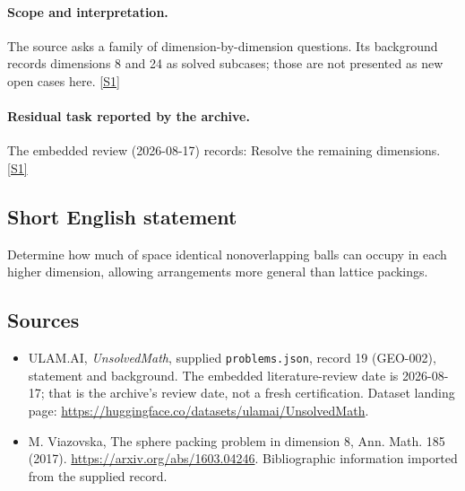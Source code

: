 \documentclass[11pt,a4paper]{article}
\newcommand{\sref}[2]{\hyperlink{source:#1:#2}{[S#2]}}
\begin{document}
\paragraph{Scope and interpretation.}

The source asks a family of dimension-by-dimension questions. Its background records dimensions 8 and 24 as solved subcases; those are not presented as new open cases here. \sref{19}{1}

\paragraph{Residual task reported by the archive.}

The embedded review (2026-08-17) records: Resolve the remaining dimensions. \sref{19}{1}

\subsection{Short English statement}

Determine how much of space identical nonoverlapping balls can occupy in each higher dimension, allowing arrangements more general than lattice packings.

\subsection{Sources}

{\small

\begin{itemize}

\item[\hypertarget{source:19:1}{S1}] ULAM.AI, \emph{UnsolvedMath}, supplied \texttt{problems.json}, record 19 (GEO-002), statement and background. The embedded literature-review date is 2026-08-17; that is the archive’s review date, not a fresh certification. Dataset landing page: \url{https://huggingface.co/datasets/ulamai/UnsolvedMath}.

\item[\hypertarget{source:19:2}{S2}] M. Viazovska, The sphere packing problem in dimension 8, Ann. Math. 185 (2017). \url{https://arxiv.org/abs/1603.04246}. Bibliographic information imported from the supplied record.

\end{itemize}

}

\label{end:19}
\end{document}
